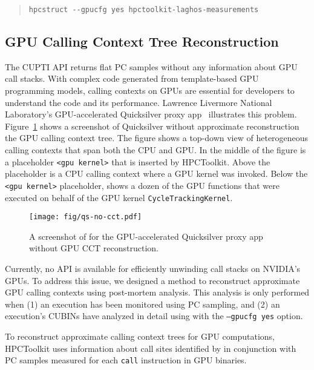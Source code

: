 \begin{quote}
\begin{verbatim}
hpcstruct --gpucfg yes hpctoolkit-laghos-measurements
\end{verbatim}
\end{quote}


\subsection{GPU Calling Context Tree Reconstruction}
\label{nvidia-cct}



The CUPTI API returns flat PC samples without any information about GPU call stacks.
With complex code generated from template-based GPU programming models, calling contexts on GPUs are essential for developers to understand the code and its performance. Lawrence Livermore National Laboratory's GPU-accelerated Quicksilver proxy app~\cite{quicksilver} illustrates this problem. Figure~\ref{qs-no-cct} shows a \hpcviewer{} screenshot of Quicksilver without approximate reconstruction the GPU calling context tree. The figure shows a top-down view of heterogeneous calling contexts that span both the CPU and GPU. In the middle of the figure is a placeholder \verb|<gpu kernel>| that is inserted by HPCToolkit. Above the placeholder is a CPU calling context where a GPU kernel was invoked. Below the \verb|<gpu kernel>| placeholder, \hpcviewer{} shows a dozen of the GPU functions that were executed on behalf of the GPU kernel \verb|CycleTrackingKernel|. 

\begin{figure}[t]
\centering
\texttt{[image: fig/qs-no-cct.pdf]}
\caption{A screenshot of \hpcviewer{} for the GPU-accelerated Quicksilver proxy app without GPU CCT reconstruction.}
\label{qs-no-cct}
\end{figure}


Currently, no API is available for efficiently unwinding call stacks on NVIDIA's GPUs.
To address this issue, we designed a method to reconstruct approximate GPU calling contexts using post-mortem analysis. This analysis is only performed when (1) an execution has been monitored using PC sampling, and (2) an execution's CUBINs have analyzed in detail using \hpcstruct{} with the {\tt --gpucfg yes} option.

To reconstruct approximate calling context trees for GPU computations, HPCToolkit uses information about call sites identified by \hpcstruct{} in conjunction with PC samples measured for each {\tt call} instruction in GPU binaries. 

